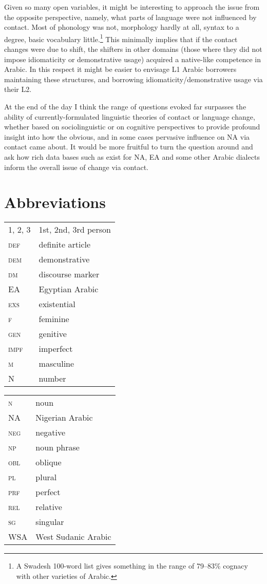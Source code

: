\documentclass[output=paper]{langsci/langscibook}
\begin{document}
Given so many open variables, it might be interesting to approach the issue from the opposite perspective, namely, what parts of language were not influenced by contact. Most of phonology was not, morphology hardly at all, syntax to a degree, basic vocabulary little.\footnote{A Swadesh 100-word list gives something in the range of 79–83\% cognacy with   other varieties of Arabic.} This minimally implies that if the contact changes were due to shift, the shifters in other domains (those where they did not impose idiomaticity or demonstrative usage) acquired a native-like competence in Arabic. In this respect it might be easier to envisage L1 Arabic borrowers maintaining these structures, and borrowing idiomaticity/demonstrative usage via their L2. 

At the end of the day I think the range of questions evoked far surpasses the ability of currently-formulated linguistic theories of contact or language change, whether based on sociolinguistic or on cognitive perspectives \citep[523]{Lucas2015} to provide profound insight into how the obvious, and in some cases pervasive influence on NA via contact came about. It would be more fruitful to turn the question around and ask how rich data bases such as exist for NA, EA and some other Arabic dialects inform the overall issue of change via contact. 

 
\section*{Abbreviations}

\begin{tabularx}{.45\textwidth}{lQ}
\textsc{1, 2, 3} & 1st, 2nd, 3rd person \\
\textsc{def} & definite article \\
\textsc{dem} & demonstrative \\
\textsc{dm} & discourse marker \\
EA & Egyptian Arabic \\
\textsc{exs} & existential  \\
\textsc{f} & feminine \\
\textsc{gen} & genitive \\
\textsc{impf} & imperfect \\
\textsc{m} & masculine \\
N & number \\
\end{tabularx}
\begin{tabularx}{.45\textwidth}{lQ}
\textsc{n} & noun \\
NA & {Nigerian Arabic} \\
\textsc{neg} & negative \\
\textsc{np} & noun phrase \\
\textsc{obl} & oblique \\
\textsc{pl} & plural \\
\textsc{prf} & perfect \\
\textsc{rel} & relative \\
\textsc{sg} & singular \\
WSA & West Sudanic Arabic \\
\end{tabularx}


\sloppy
\printbibliography[heading=subbibliography,notkeyword=this] 
\end{document}
